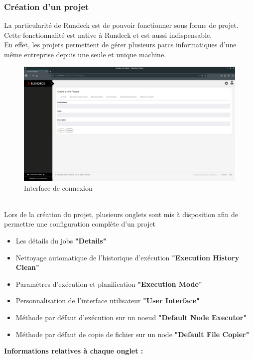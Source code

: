 \documentclass[12pt]{article}
\begin{document}
\subsubsection{Création d'un projet}
La particularité de Rundeck est de pouvoir fonctionner sous forme de projet. Cette fonctionnalité est native à Rundeck et est aussi indispensable.
\\
En effet, les projets permettent de gérer plusieurs parcs informatiques d'une même entreprise depuis une seule et unique machine.
\\
\begin{figure}[ht]
    \includegraphics[scale=0.23]{images/project.png}
    \caption{Interface de connexion}
\end{figure}
\\
Lors de la création du projet, plusieurs onglets sont mis à disposition afin de permettre une configuration complète d'un projet
\\
\begin{itemize}
    \item Les détails du jobs \textbf{"Details"}
    \item Nettoyage automatique de l'historique d'exécution \textbf{"Execution History Clean"}
    \item Paramètres d'exécution et planification \textbf{"Execution Mode"}
    \item Personnalisation de l'interface utilisateur \textbf{"User Interface"}
    \item Méthode par défaut d'exécution sur un noeud \textbf{"Default Node Executor"}
    \item Méthode par défaut de copie de fichier sur un node \textbf{"Default File Copier"}
\end{itemize}
\vspace{0.5cm}
\textbf{Informations relatives à chaque onglet :}
\end{document}
